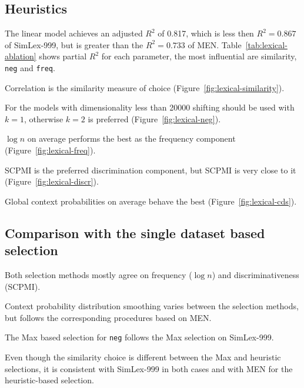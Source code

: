 

\subsection{Heuristics}



The linear model achieves an adjusted $R^2$ of 0.817, which is less then $R^2 = 0.867$ of SimLex-999, but is greater than the $R^2 = 0.733$ of MEN. Table~\ref{tab:lexical-ablation} shows partial $R^2$ for each parameter, the most influential are similarity, \texttt{neg} and \texttt{freq}.


Correlation is the similarity measure of choice (Figure~\ref{fig:lexical-similarity}).

% 
For the models with dimensionality less than 20000 shifting should be used with $k = 1$, otherwise $k = 2$ is preferred (Figure~\ref{fig:lexical-neg}).


$\log n$ on average performs the best as the frequency component (Figure~\ref{fig:lexical-freq}).

% 
SCPMI is the preferred discrimination component, but SCPMI is very close to it (Figure~\ref{fig:lexical-discr}).


Global context probabilities on average behave the best (Figure~\ref{fig:lexical-cds}).



\subsection{Comparison with the single dataset based selection}

Both selection methods mostly agree on frequency ($\log n$) and discriminativeness (SCPMI).

Context probability distribution smoothing varies between the selection methods, but follows the corresponding procedures based on MEN.

The Max based selection for \texttt{neg} follows the Max selection on SimLex-999.

Even though the similarity choice is different between the Max and heuristic selections, it is consistent with SimLex-999 in both cases and with MEN for the heuristic-based selection.


